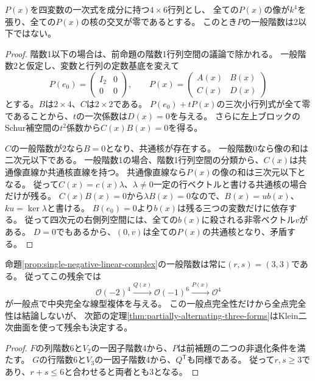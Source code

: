 \begin{lemma}\label{lem:no-rank-two-four-by-six}
$P(x)$を四変数の一次式を成分に持つ$4\times6$行列とし、
全ての$P(x)$の像が$k^4$を張り、全ての$P(x)$の核の交叉が零であるとする。
このとき$P$の一般階数は2以下ではない。
\end{lemma}
\begin{proof}
階数1以下の場合は、前命題の階数1行列空間の議論で除かれる。
一般階数2と仮定し、変数と行列の定数基底を変えて
\[
 P(e_0)=\begin{pmatrix}I_2&0\\0&0\end{pmatrix},\qquad
 P(x)=\begin{pmatrix}A(x)&B(x)\\ C(x)&D(x)\end{pmatrix}
\]
とする。$B$は$2\times4$、$C$は$2\times2$である。
$P(e_0)+tP(x)$の三次小行列式が全て零であることから、$t$の一次係数は$D(x)=0$を与える。
さらに左上ブロックのSchur補空間の$t^2$係数から$C(x)B(x)=0$を得る。

$C$の一般階数が2なら$B=0$となり、共通核が存在する。
一般階数0なら像の和は二次元以下である。
一般階数1の場合、階数1行列空間の分類から、$C(x)$は共通像直線か共通核直線を持つ。
共通像直線なら$P(x)$の像の和は三次元以下となる。
従って$C(x)=c(x)\lambda$、$\lambda\ne0$一定の行ベクトルと書ける共通核の場合だけが残る。
$C(x)B(x)=0$から$\lambda B(x)=0$なので、$B(x)=u b(x)$、$ku=\ker\lambda$と書ける。
$B(e_0)=0$より$b(x)$は残る三つの変数だけに依存する。
従って四次元の右側列空間には、全ての$b(x)$に殺される非零ベクトル$v$がある。
$D=0$でもあるから、$(0,v)$は全ての$P(x)$の共通核となり、矛盾する。
\end{proof}

\begin{corollary}[単一隣接交代sliceの一般階数]\label{cor:single-negative-ranks-three}
命題\ref{prop:single-negative-linear-complex}の一般階数は常に$(r,s)=(3,3)$である。
従ってこの残余では
\[
 \mathcal O(-2)^4\xrightarrow{Q(x)}\mathcal O(-1)^6
 \xrightarrow{P(x)}\mathcal O^4
\]
が一般点で中央完全な線型複体を与える。
この一般点完全性だけから全点完全性は結論しないが、
次節の定理\ref{thm:partially-alternating-three-forms}はKlein二次曲面を使って残余も決定する。
\end{corollary}
\begin{proof}
$F$の列階数6と$V_2$の一因子階数4から、$P$は前補題の二つの非退化条件を満たす。
$G$の行階数6と$V_3$の一因子階数4から、$Q^{\mathsf T}$も同様である。
従って$r,s\geq3$であり、$r+s\leq6$と合わせると両者とも3となる。
\end{proof}
